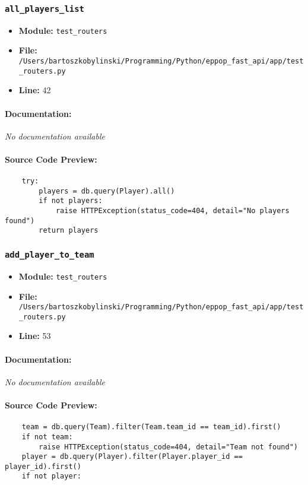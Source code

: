 \documentclass[11pt,a4paper]{article}
\begin{document}
\vspace{1em}
\subsubsection{\texttt{all\_players\_list}}

\begin{itemize}
    \item \textbf{Module:} \texttt{test\_routers}
    \item \textbf{File:} \texttt{/Users/bartoszkobylinski/Programming/Python/eppop\_fast\_api/app/test\_routers.py}
    \item \textbf{Line:} 42
\end{itemize}

\paragraph{Documentation:} \textit{No documentation available}

\paragraph{Source Code Preview:}
\begin{verbatim}
    try:
        players = db.query(Player).all()
        if not players:
            raise HTTPException(status_code=404, detail="No players found")
        return players
\end{verbatim}

\vspace{1em}
\subsubsection{\texttt{add\_player\_to\_team}}

\begin{itemize}
    \item \textbf{Module:} \texttt{test\_routers}
    \item \textbf{File:} \texttt{/Users/bartoszkobylinski/Programming/Python/eppop\_fast\_api/app/test\_routers.py}
    \item \textbf{Line:} 53
\end{itemize}

\paragraph{Documentation:} \textit{No documentation available}

\paragraph{Source Code Preview:}
\begin{verbatim}
    team = db.query(Team).filter(Team.team_id == team_id).first()
    if not team:
        raise HTTPException(status_code=404, detail="Team not found")
    player = db.query(Player).filter(Player.player_id == player_id).first()
    if not player:
\end{verbatim}
\end{document}
